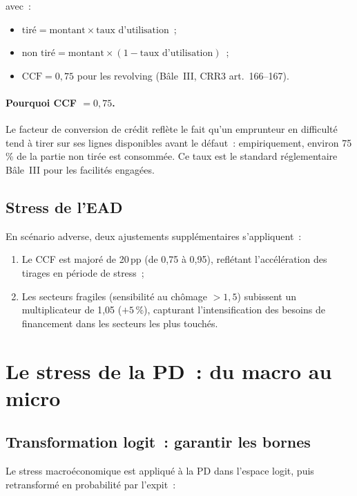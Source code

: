 \documentclass[12pt, a4paper, twoside, openright]{report}
\theoremstyle{definition}
\begin{document}
\noindent avec~:
\begin{itemize}[nosep]
  \item $\text{tiré} = \text{montant} \times \text{taux d'utilisation}$~;
  \item $\text{non tiré} = \text{montant} \times (1 - \text{taux d'utilisation})$~;
  \item $\text{CCF} = 0{,}75$ pour les revolving (Bâle~III, CRR3 art.~166--167).
\end{itemize}

\paragraph{Pourquoi CCF $= 0{,}75$.} Le facteur de conversion de crédit reflète le fait qu'un emprunteur en difficulté tend à tirer sur ses lignes disponibles avant le défaut~: empiriquement, environ 75\,\% de la partie non tirée est consommée. Ce taux est le standard réglementaire Bâle~III pour les facilités engagées.

\subsection{Stress de l'EAD}

En scénario adverse, deux ajustements supplémentaires s'appliquent~:
\begin{enumerate}[nosep]
  \item Le CCF est majoré de 20\,pp (de 0{,}75 à 0{,}95), reflétant l'accélération des tirages en période de stress~;
  \item Les secteurs fragiles (sensibilité au chômage $> 1{,}5$) subissent un multiplicateur de 1{,}05 ($+5\,\%$), capturant l'intensification des besoins de financement dans les secteurs les plus touchés.
\end{enumerate}

\section{Le stress de la PD~: du macro au micro}
\label{sec:ecl:pd-stress}

\subsection{Transformation logit~: garantir les bornes}

Le stress macroéconomique est appliqué à la PD dans l'espace logit, puis retransformé en probabilité par l'expit~:
\end{document}

